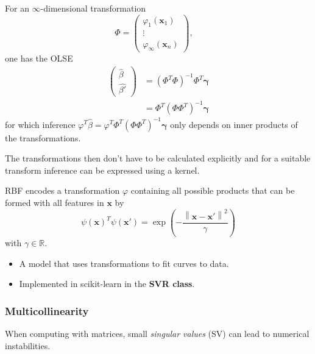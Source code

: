 
For an $\infty$-dimensional transformation
\begin{equation*}
    \Phi =
    \begin{pmatrix}
        \varphi_1(\mathbf{x}_1) \\
        \vdots                  \\
        \varphi_\infty(\mathbf{x}_n)
    \end{pmatrix},\quad
\end{equation*}
one has the OLSE
\begin{align*}
    \begin{pmatrix}
        \hat{\beta} \\
        \widehat{\beta'}
    \end{pmatrix} & ={(\Phi^T \Phi)}^{-1}\Phi^T\boldsymbol{\gamma}    \\
                     & =\Phi^T{(\Phi \Phi^T)}^{-1}\boldsymbol{\gamma}
\end{align*}
for which inference $\varphi^T \hat{\beta} = \varphi^T \Phi^T{(\Phi \Phi^T)}^{-1}\boldsymbol{\gamma}$ only depends on inner products of the transformations.

The transformations then don't have to be calculated explicitly and for a suitable transform inference can be expressed using a kernel.

RBF encodes a transformation $\varphi$ containing all possible products that can be formed with all features in $\mathbf{x}$ by
\begin{equation*}
    {\psi(\mathbf{x})}^T\psi(\mathbf{x}')=\exp\left(-\frac{\left\|\mathbf{x}-\mathbf{x}'\right\|^{2}}{\gamma}\right)
\end{equation*}
with $\gamma \in \mathbb{R}$.


\begin{itemize}
    \item A model that uses transformations to fit curves to data.
    \item Implemented in scikit-learn in the \textbf{SVR class}.
\end{itemize}


\subsubsection{Multicollinearity}
When computing with matrices, small \textit{singular values} (SV) can lead to numerical instabilities.

